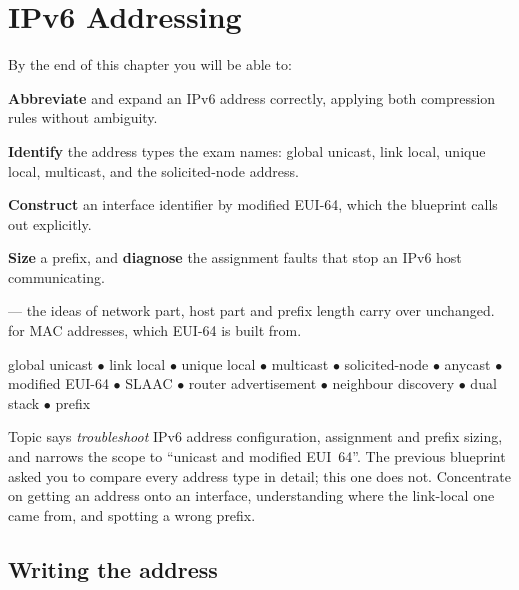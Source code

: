 \chapter{IPv6 Addressing}\label{ch:ipv6}

\begin{outcomes}
By the end of this chapter you will be able to:
\begin{tight}
  \item \textbf{Abbreviate} and expand an IPv6 address correctly, applying both
        compression rules without ambiguity.
  \item \textbf{Identify} the address types the exam names: global unicast, link
        local, unique local, multicast, and the solicited-node address.
  \item \textbf{Construct} an interface identifier by modified EUI-64, which the
        blueprint calls out explicitly.
  \item \textbf{Size} a prefix, and \textbf{diagnose} the assignment faults that
        stop an IPv6 host communicating.
\end{tight}
\end{outcomes}

\begin{prereq}
 --- the ideas of network part, host part and prefix length carry
over unchanged.  for MAC addresses, which EUI-64 is built from.
\end{prereq}

\begin{keyterms}
global unicast $\bullet$ link local $\bullet$ unique local $\bullet$ multicast
$\bullet$ solicited-node $\bullet$ anycast $\bullet$ modified EUI-64 $\bullet$
SLAAC $\bullet$ router advertisement $\bullet$ neighbour discovery $\bullet$
dual stack $\bullet$ prefix
\end{keyterms}

\begin{examnote}
Topic  says \emph{troubleshoot} IPv6 address configuration, assignment
and prefix sizing, and narrows the scope to ``unicast and modified EUI~64''. The
previous blueprint asked you to compare every address type in detail; this one
does not. Concentrate on getting an address onto an interface, understanding
where the link-local one came from, and spotting a wrong prefix.
\end{examnote}

\section{Writing the address}

